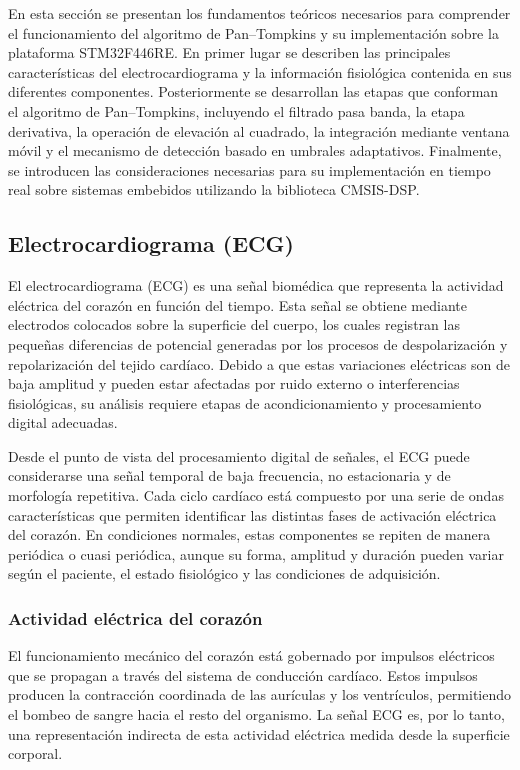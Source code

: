 \documentclass[12pt]{article}
\begin{document}
		En esta sección se presentan los fundamentos teóricos necesarios para comprender el funcionamiento del algoritmo de Pan--Tompkins y su implementación sobre la plataforma STM32F446RE. En primer lugar se describen las principales características del electrocardiograma y la información fisiológica contenida en sus diferentes componentes. Posteriormente se desarrollan las etapas que conforman el algoritmo de Pan--Tompkins, incluyendo el filtrado pasa banda, la etapa derivativa, la operación de elevación al cuadrado, la integración mediante ventana móvil y el mecanismo de detección basado en umbrales adaptativos. Finalmente, se introducen las consideraciones necesarias para su implementación en tiempo real sobre sistemas embebidos utilizando la biblioteca CMSIS-DSP.
		
			\subsection{Electrocardiograma (ECG)}

				El electrocardiograma (ECG) es una señal biomédica que representa la actividad eléctrica del corazón en función del tiempo. Esta señal se obtiene mediante electrodos colocados sobre la superficie del cuerpo, los cuales registran las pequeñas diferencias de potencial generadas por los procesos de despolarización y repolarización del tejido cardíaco. Debido a que estas variaciones eléctricas son de baja amplitud y pueden estar afectadas por ruido externo o interferencias fisiológicas, su análisis requiere etapas de acondicionamiento y procesamiento digital adecuadas.

				Desde el punto de vista del procesamiento digital de señales, el ECG puede considerarse una señal temporal de baja frecuencia, no estacionaria y de morfología repetitiva. Cada ciclo cardíaco está compuesto por una serie de ondas características que permiten identificar las distintas fases de activación eléctrica del corazón. En condiciones normales, estas componentes se repiten de manera periódica o cuasi periódica, aunque su forma, amplitud y duración pueden variar según el paciente, el estado fisiológico y las condiciones de adquisición.

				\subsubsection{Actividad eléctrica del corazón}

				El funcionamiento mecánico del corazón está gobernado por impulsos eléctricos que se propagan a través del sistema de conducción cardíaco. Estos impulsos producen la contracción coordinada de las aurículas y los ventrículos, permitiendo el bombeo de sangre hacia el resto del organismo. La señal ECG es, por lo tanto, una representación indirecta de esta actividad eléctrica medida desde la superficie corporal.
\end{document}
